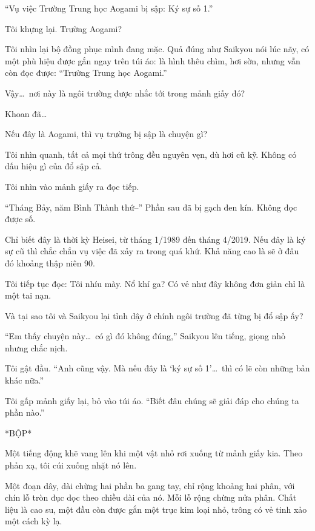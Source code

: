 \documentclass[../main.tex]{subfiles}
\begin{document}
``{\vnmsans Vụ việc Trường Trung học Aogami bị sập: Ký sự số 1.}''

Tôi khựng lại. Trường Aogami?

Tôi nhìn lại bộ đồng phục mình đang mặc. Quả đúng như Saikyou nói lúc nãy, có một phù hiệu được gắn ngay trên túi áo: là hình thêu chìm, hơi sờn, nhưng vẫn còn đọc được: ``Trường Trung học Aogami.''

Vậy\dots\ nơi này là ngôi trường được nhắc tới trong mảnh giấy đó?

Khoan đã\dots

Nếu đây là Aogami, thì vụ trường bị sập là chuyện gì?

Tôi nhìn quanh, tất cả mọi thứ trông đều nguyên vẹn, dù hơi cũ kỹ. Không có dấu hiệu gì của đổ sập cả.

Tôi nhìn vào mảnh giấy ra đọc tiếp.

``{\vnmsans Tháng Bảy, năm Bình Thành thứ--}'' Phần sau đã bị gạch đen kín. Không đọc được số.

Chỉ biết đây là thời kỳ Heisei, từ tháng 1/1989 đến tháng 4/2019. Nếu đây là ký sự cũ thì chắc chắn vụ việc đã xảy ra trong quá khứ. Khả năng cao là sẽ ở đâu đó khoảng thập niên 90.

Tôi tiếp tục đọc:
Tôi nhíu mày. Nổ khí ga? Có vẻ như đây không đơn giản chỉ là một tai nạn.

Và tại sao tôi và Saikyou lại tỉnh dậy ở chính ngôi trường đã từng bị đổ sập ấy?

``Em thấy chuyện này\dots\ có gì đó không đúng,'' Saikyou lên tiếng, giọng nhỏ nhưng chắc nịch.

Tôi gật đầu. ``Anh cũng vậy. Mà nếu đây là `ký sự số 1'\dots\ thì có lẽ còn những bản khác nữa.''

Tôi gấp mảnh giấy lại, bỏ vào túi áo. ``Biết đâu chúng sẽ giải đáp cho chúng ta phần nào.''

*BỘP*

Một tiếng động khẽ vang lên khi một vật nhỏ rơi xuống từ mảnh giấy kia. Theo phản xạ, tôi cúi xuống nhặt nó lên.

Một đoạn dây, dài chừng hai phần ba gang tay, chỉ rộng khoảng hai phân, với chín lỗ tròn đục dọc theo chiều dài của nó. Mỗi lỗ rộng chừng nửa phân. Chất liệu là cao su, một đầu còn được gắn một trục kim loại nhỏ, trông có vẻ tinh xảo một cách kỳ lạ.
\end{document}
